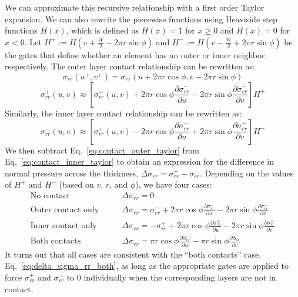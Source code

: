\documentclass[11pt]{article}
\begin{document}
We can approximate this recursive relationship with a first order Taylor expansion. We can also rewrite the piecewise functions using Heaviside step functions $H(x)$, which is defined as $H(x)=1$ for $x\ge 0$ and $H(x)=0$ for $x<0$. Let $H^+ := H(v+\frac{W}{2}-2\pi r\sin\phi)$ and $H^- := H(v-\frac{W}{2}+2\pi r\sin\phi)$ be the gates that define whether an element has an outer or inner neighbor, respectively. The outer layer contact relationship can be rewritten as:
\begin{equation}
    \sigma_{rr}^-(u^+,v^+) = \sigma_{rr}^-(u+2\pi r\cos\phi,v-2\pi r\sin\phi)
\end{equation}
\begin{equation}\label{eq:contact_outer_taylor}
    \sigma_{rr}^+(u,v) \approx \left[\sigma_{rr}^-(u,v) + 2\pi r\cos\phi\frac{\partial\sigma_{rr}^-}{\partial u} - 2\pi r\sin\phi\frac{\partial\sigma_{rr}^-}{\partial v}\right]H^+
\end{equation}
Similarly, the inner layer contact relationship can be rewritten as:
\begin{equation}\label{eq:contact_inner_taylor}
    \sigma_{rr}^-(u,v) \approx \left[\sigma_{rr}^+(u,v) - 2\pi r\cos\phi\frac{\partial  \sigma_{rr}^+}{\partial u} + 2\pi r\sin\phi\frac{\partial\sigma_{rr}^+}{\partial v}\right]H^-
\end{equation}
We then subtract Eq.~\ref{eq:contact_outer_taylor} from Eq.~\ref{eq:contact_inner_taylor} to obtain an expression for the difference in normal pressure across the thickness, $\Delta \sigma_{rr} = \sigma_{rr}^+ - \sigma_{rr}^-$. Depending on the values of $H^+$ and $H^-$ (based on $v$, $r$, and $\phi$), we have four cases:
\begin{align}
    \text{No contact}&\qquad \Delta \sigma_{rr} = 0\\
    \text{Outer contact only}&\qquad \Delta \sigma_{rr} = \sigma_{rr}^- + 2\pi r\cos\phi\frac{\partial\sigma_{rr}^-}{\partial u} - 2\pi r\sin\phi\frac{\partial\sigma_{rr}^-}{\partial v}\\
    \text{Inner contact only}&\qquad \Delta \sigma_{rr} = -\sigma_{rr}^+ + 2\pi r\cos\phi\frac{\partial\sigma_{rr}^+}{\partial u} - 2\pi r\sin\phi\frac{\partial\sigma_{rr}^+}{\partial v}\\
    \text{Both contacts}&\qquad \boxed{\Delta \sigma_{rr} = \pi r\cos\phi\frac{\partial S_{rr}}{\partial u} - \pi r\sin\phi\frac{\partial S_{rr}}{\partial v}}\label{eq:delta_sigma_rr_both}
\end{align}
It turns out that all cases are consistent with the ``both contacts'' case, Eq.~\ref{eq:delta_sigma_rr_both}, as long as the appropriate gates are applied to force $\sigma_{rr}^+$ and $\sigma_{rr}^-$ to 0 individually when the corresponding layers are not in contact. 
\end{document}
